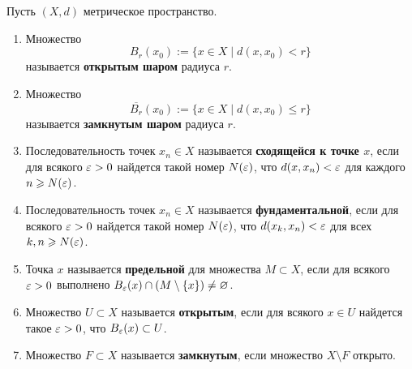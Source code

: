 \documentclass[a4paper]{article}
\theoremstyle{named}
\begin{document}
    \begin{definition*}
        Пусть $(X, d)$ метрическое пространство.
        \begin{enumerate}
        \item
            Множество 
            \begin{equation*}
                B_r(x_0) := \{x \in X \mid d(x, x_0) < r\}
            \end{equation*}
            называется \textbf{открытым шаром} радиуса $r$.

        \item
            Множество
            \begin{equation*}
                \overline{B_r}(x_0) := \{x \in X \mid d(x, x_0) \leq r\}
            \end{equation*}
            называется \textbf{замкнутым шаром} радиуса $r$.

        \item
            Последовательность точек $x_n \in X$ называется \textbf{сходящейся к точке $x$}, если для всякого $\varepsilon > 0$ найдется такой номер $N(\varepsilon)$, что $d(x, x_n) < \varepsilon$ для каждого $n \geqslant N(\varepsilon)$.

        \item
            Последовательность точек $x_n \in X$ называется \textbf{фундаментальной}, если для всякого $\varepsilon > 0$ найдется такой номер $N(\varepsilon)$, что $d(x_k, x_n) < \varepsilon$ для всех $k, n \geqslant N(\varepsilon)$.

        \item
            Точка $x$ называется \textbf{предельной} для множества $M \subset X$, если для всякого $\varepsilon > 0$ выполнено $B_{\varepsilon}(x) \cap (M \setminus \{x\}) \neq \varnothing$.

        \item
            Множество $U \subset X$ называется \textbf{открытым}, если для всякого $x \in U$ найдется такое $\varepsilon > 0$, что $B_{\varepsilon}(x) \subset U$.

        \item
            Множество $F \subset X$ называется \textbf{замкнутым}, если множество $X \setminus F$ открыто.
        \end{enumerate}
    \end{definition*}   
\end{document}
